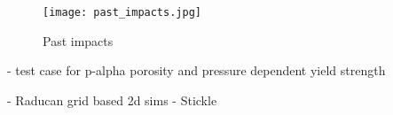\begin{figure}[H]
    \centering
    \texttt{[image: past\_impacts.jpg]}
    \caption{Past impacts \cite{wiki:past_impacts}}
    \label{fig:past_impacts}
\end{figure}


- test case for p-alpha porosity and pressure dependent yield strength

- Raducan \cite{Raducan_2019_strength} grid based 2d sims
- Stickle \cite{Stickle_2017}